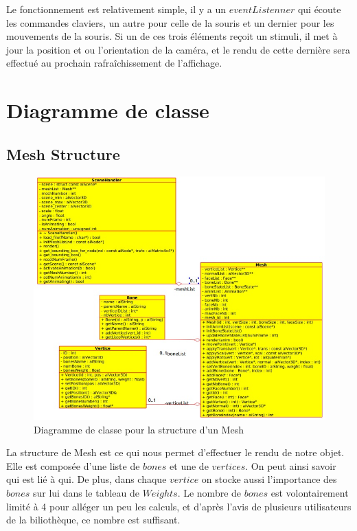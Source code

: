 \documentclass[a4paper]{report}
\begin{document}
Le fonctionnement est relativement simple, il y a un $eventListenner$ qui écoute les commandes claviers, un autre pour celle de la souris et un dernier pour les mouvements de la souris. Si un de ces trois éléments reçoit un stimuli, il met à jour la position et ou l'orientation de la caméra, et le rendu de cette dernière sera effectué au prochain rafraîchissement de l'affichage. 

\newpage
\chapter{Diagramme de classe}
\section{Mesh Structure}
\begin{figure}[H]
    \begin{center}
        \includegraphics[width=1\textwidth]{MeshStructure.jpg}
        \caption{Diagramme de classe pour la structure d'un Mesh}
    \end{center}
\end{figure}

\par
La structure de Mesh est ce qui nous permet d'effectuer le rendu de notre objet. Elle est composée d'une liste de $bones$ et une de $vertices$. On peut ainsi savoir qui est lié à qui. De plus, dans chaque $vertice$ on stocke aussi l'importance des $bones$ sur lui dans le tableau de $Weights$. Le nombre de $bones$ est volontairement limité à 4 pour alléger un peu les calculs, et d'après l'avis de plusieurs utilisateurs de la biliothèque, ce nombre est suffisant. 
\end{document}
